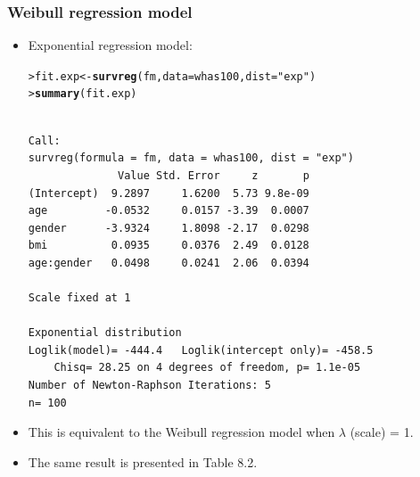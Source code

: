 \documentclass[10pt]{beamer}\usepackage[]{graphicx}\usepackage[]{color}
\makeatletter
\newcommand{\hlstr}[1]{\textcolor[rgb]{0.192,0.494,0.8}{#1}}%
\newcommand{\hlstd}[1]{\textcolor[rgb]{0.345,0.345,0.345}{#1}}%
\newcommand{\hlkwb}[1]{\textcolor[rgb]{0.69,0.353,0.396}{#1}}%
\newcommand{\hlkwc}[1]{\textcolor[rgb]{0.333,0.667,0.333}{#1}}%
\newcommand{\hlkwd}[1]{\textcolor[rgb]{0.737,0.353,0.396}{\textbf{#1}}}%
\newenvironment{kframe}{%
 \def\at@end@of@kframe{}%
 \ifinner\ifhmode%
  \def\at@end@of@kframe{\end{minipage}}%
  \begin{minipage}{\columnwidth}%
 \fi\fi%
 \def\FrameCommand##1{\hskip\@totalleftmargin \hskip-\fboxsep
 \colorbox{shadecolor}{##1}\hskip-\fboxsep
     \hskip-\linewidth \hskip-\@totalleftmargin \hskip\columnwidth}%
 \MakeFramed {\advance\hsize-\width
   \@totalleftmargin\z@ \linewidth\hsize
   \@setminipage}}%
 {\par\unskip\endMakeFramed%
 \at@end@of@kframe}
\newenvironment{knitrout}{}{} %
\renewenvironment{knitrout}{\setlength{\topsep}{-.2mm}}{}
\makeatother
\begin{document}
\begin{frame}[fragile]
  \frametitle{Weibull regression model}
  \begin{itemize}
  \item Exponential regression model:
\begin{knitrout}\scriptsize
{}\color{fgcolor}\begin{kframe}
\begin{alltt}
\hlstd{> }\hlstd{fit.exp} \hlkwb{<-} \hlkwd{survreg}\hlstd{(fm,} \hlkwc{data} \hlstd{= whas100,} \hlkwc{dist} \hlstd{=} \hlstr{"exp"}\hlstd{)}
\hlstd{> }\hlkwd{summary}\hlstd{(fit.exp)}
\end{alltt}
\begin{verbatim}

Call:
survreg(formula = fm, data = whas100, dist = "exp")
              Value Std. Error     z       p
(Intercept)  9.2897     1.6200  5.73 9.8e-09
age         -0.0532     0.0157 -3.39  0.0007
gender      -3.9324     1.8098 -2.17  0.0298
bmi          0.0935     0.0376  2.49  0.0128
age:gender   0.0498     0.0241  2.06  0.0394

Scale fixed at 1 

Exponential distribution
Loglik(model)= -444.4   Loglik(intercept only)= -458.5
	Chisq= 28.25 on 4 degrees of freedom, p= 1.1e-05 
Number of Newton-Raphson Iterations: 5 
n= 100 
\end{verbatim}
\end{kframe}
\end{knitrout}
\item This is equivalent to the Weibull regression model when $\lambda$ (scale) = 1.
\item The same result is presented in Table 8.2.
\end{itemize}
\end{frame}
\end{document}
